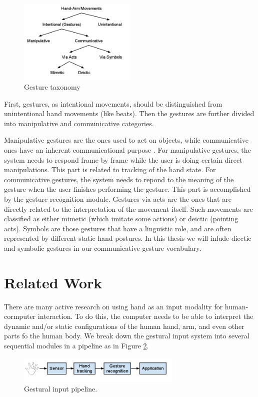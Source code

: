 \begin{figure}[h]
  \centering
  \includegraphics[width=0.5\textwidth]{figures/taxonomy.png} 
  \caption{Gesture taxonomy}
  \label{fig:taxonomy}
\end{figure}

First, gestures, as intentional movements, should be distinguished from
unintentional hand movements (like beats). Then the gestures are further divided
into manipulative and communicative categories. 

Manipulative gestures are the ones used to act on objects, while communicative 
ones have an inherent communicational purpose \cite{Pavlovic97}. For
manipulative gestures, the system needs to respond frame by frame while the user is doing
certain direct manipulations. This part is related to tracking of the hand
state. For communicative gestures, the system needs to repond to the meaning of
the gesture when the user finishes performing the gesture. This part is
accomplished by the gesture recognition module. Gestures via acts are the ones
that are directly related to the interpretation of the movement itself. Such movements
are classified as either mimetic (which imitate some actions) or deictic
(pointing acts). Symbols are those gestures that have a linguistic role, and are
often represented by different static hand postures. In this thesis we will
inlude diectic and symbolic gestures in our communicative gesture vocabulary.

\section{Related Work}
There are many active research on using hand as an input modality for
human-cormputer interaction. To do this, the computer needs to be able to
interpret the dynamic and/or static configurations of the human hand, arm, and
even other parts fo the human body. We break down the gestural input
system into several sequential modules in a pipeline as in Figure
\ref{fig:pipeline}.

\begin{figure}[h]
  \centering
  \includegraphics[width=0.7\textwidth]{figures/pipeline.png} 
  \caption{Gestural input pipeline.}
  \label{fig:pipeline}
\end{figure}

